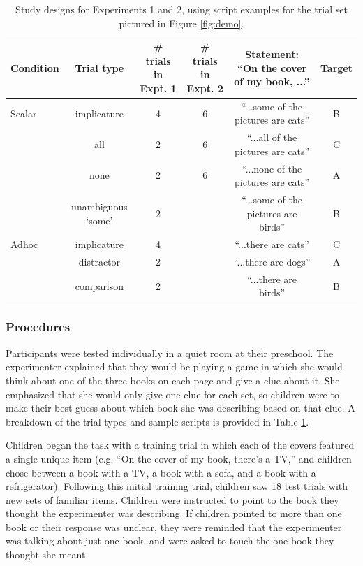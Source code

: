 \documentclass[10pt,letterpaper]{article}
\begin{document}
 \begin{table} [t]
   \caption{Study designs for Experiments 1 and 2, using script examples for the trial set pictured in Figure \ref{fig:demo}.  \label{tab:scripts} } 
   \begin{center} 
     \begin{tabular}{lccccc} 
                      \hline 
       \null   Condition  & Trial type & \# trials in Expt. 1 & \# trials in Expt. 2 & Statement: ``On the cover of my book, ...'' & Target   \\ 
       \hline  
            Scalar & implicature & 4 & 6 &  ``...some of the pictures are cats'' & B	 \\ 
          & all  & 2 &  6 & ``...all of the pictures are cats'' & C		                 \\
           & none  & 2 & 6 & ``...none of the pictures are cats'' & A			\\ 
               & unambiguous `some' 	&  2 &  & ``...some of the pictures are birds'' & B					        \\ 
	\hline
	    Adhoc       & implicature & 4 &  & ``...there are cats'' & C 		\\ 
	     & distractor & 2 &  & ``...there are dogs'' & A	     \\ 
          & comparison & 2 &  & ``...there are birds'' & B 	   \\
       \hline 
     \end{tabular} 
  \end{center}
 \end{table}
 
\subsubsection{Procedures}

Participants were tested individually in a quiet room at their preschool.  The experimenter explained that they would be playing a game in which she would think about one of the three books on each page and give a clue about it. She emphasized that she would only give one clue for each set, so children were to make their best guess about which book she was describing based on that clue. A breakdown of the trial types and sample scripts is provided in Table \ref{tab:scripts}.

Children began the task with a training trial in which each of the covers featured a single unique item (e.g. ``On the cover of my book, there's a TV,'' and children chose between a book with a TV, a book with a sofa, and a book with a refrigerator). Following this initial training trial, children saw 18 test trials with new sets of familiar items. Children were instructed to point to the book they thought the experimenter was describing. If children pointed to more than one book or their response was unclear, they were reminded that the experimenter was talking about just one book, and were asked to touch the one book they thought she meant.  
\end{document}
